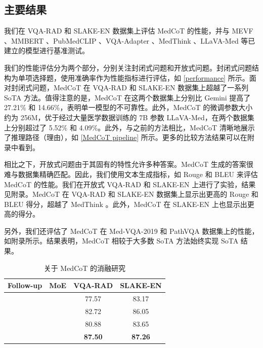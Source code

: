 \documentclass[11pt]{article}
\newcommand{\greencheck}{\textcolor{darkgreen}{\ding{51}}}
\begin{document}
\subsection{主要结果}
我们在 VQA-RAD 和 SLAKE-EN 数据集上评估 MedCoT 的性能，并与 MEVF \cite{nguyen2019overcoming}、MMBERT \cite{tiong-etal-2022-plug}、PubMedCLIP \cite{eslami-etal-2023-pubmedclip}、VQA-Adapter \cite{liu2023parameter}、MedThink \cite{gai2024medthink}、LLaVA-Med \cite{li2024llava} 等已建立的模型进行基准测试。

我们的性能评估分为两个部分，分别关注封闭式问题和开放式问题。封闭式问题结构为单项选择题，使用准确率作为性能指标进行评估，如 \autoref{performance} 所示。面对封闭式问题，MedCoT 在 VQA-RAD 和 SLAKE-EN 数据集上超越了一系列 SoTA 方法。值得注意的是，MedCoT 在这两个数据集上分别比 Gemini 提高了 27.21\% 和 14.66\%，表明单一模型的不可靠性。此外，MedCoT 的微调参数大小约为 256M，优于经过大量医学数据训练的 7B 参数 LLaVA-Med，在两个数据集上分别超过了 5.52\% 和 4.09\%。此外，与之前的方法相比，MedCoT 清晰地展示了推理路径（理由），如 \autoref{MedCoT pipeline} 所示。更多的比较方法结果可以在附录中看到。

相比之下，开放式问题由于其固有的特性允许多种答案。MedCoT 生成的答案很难与数据集精确匹配。因此，我们使用文本生成指标，如 Rouge 和 BLEU 来评估 MedCoT 的性能。我们在开放式 VQA-RAD 和 SLAKE-EN 上进行了实验，结果见附录。MedCoT 在 VQA-RAD 和 SLAKE-EN 数据集上显示出更高的 Rouge 和 BLEU 得分，超越了 MedThink \cite{gai2024medthink}。此外，MedCoT 在 SLAKE-EN 上也显示出更高的得分。

另外，我们还评估了 MedCoT 在 Med-VQA-2019 和 PathVQA 数据集上的性能，如附录所示。结果表明，MedCoT 相较于大多数 SoTA 方法始终实现 SoTA 结果。

\begin{table}
\centering
\small
\setlength{\extrarowheight}{0pt}
\addtolength{\extrarowheight}{\aboverulesep}
\addtolength{\extrarowheight}{\belowrulesep}
\setlength{\aboverulesep}{0pt}
\setlength{\belowrulesep}{0pt}
\caption{关于 MedCoT 的消融研究}
\label{xiaorong}
\begin{tabular}{cc|cc}
\toprule
Follow-up & MoE & VQA-RAD                                        & SLAKE-EN                                        \\
\hline
          &     & 77.57                                          & 83.17                                           \\
   \greencheck       &     & 82.72                                          & 86.05                                           \\
          &  \greencheck   & 80.88                                          & 83.65                                           \\
  \greencheck        &  \greencheck   & {\cellcolor[rgb]{1,0.875,0.757}}\textbf{87.50} & {\cellcolor[rgb]{1,0.875,0.757}}\textbf{87.26}  \\
\bottomrule
\end{tabular}
\end{table}
\end{document}
